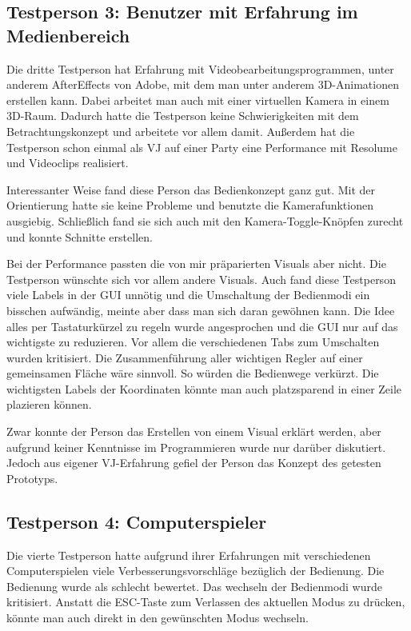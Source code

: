 \subsection{Testperson 3: Benutzer mit Erfahrung im Medienbereich}

Die dritte Testperson hat Erfahrung mit Videobearbeitungsprogrammen, unter anderem AfterEffects von Adobe, mit dem man
unter anderem 3D-Animationen erstellen kann. Dabei arbeitet man auch mit einer virtuellen Kamera in einem 3D-Raum.
Dadurch hatte die Testperson keine Schwierigkeiten mit dem Betrachtungskonzept und arbeitete vor allem damit.
Au\ss{}erdem hat die Testperson schon einmal als VJ auf einer Party eine Performance mit Resolume und Videoclips realisiert.

Interessanter Weise fand diese Person das Bedienkonzept ganz gut. Mit der Orientierung hatte sie keine Probleme und
benutzte die Kamerafunktionen ausgiebig. Schlie\ss{}lich fand sie sich auch mit den Kamera-Toggle-Kn\"opfen zurecht und
konnte Schnitte erstellen.

Bei der Performance passten die von mir pr\"aparierten Visuals aber nicht. Die Testperson w\"unschte sich vor allem andere
Visuals. Auch fand diese Testperson viele Labels in der GUI unn\"otig und die Umschaltung der Bedienmodi ein bisschen
aufw\"andig, meinte aber dass man sich daran gew\"ohnen kann. Die Idee alles per Tastaturk\"urzel zu regeln wurde
angesprochen und die GUI nur auf das wichtigste zu reduzieren. Vor allem die verschiedenen Tabs zum Umschalten wurden
kritisiert. Die Zusammenf\"uhrung aller wichtigen Regler auf einer gemeinsamen Fl\"ache w\"are sinnvoll. So w\"urden
die Bedienwege verk\"urzt. Die wichtigsten Labels der Koordinaten k\"onnte man auch platzsparend in einer Zeile plazieren
k\"onnen.

Zwar konnte der Person das Erstellen von einem Visual erkl\"art werden, aber aufgrund keiner Kenntnisse im Programmieren
wurde nur dar\"uber diskutiert. Jedoch aus eigener VJ-Erfahrung gefiel der Person das Konzept des getesten Prototyps.

\subsection{Testperson 4: Computerspieler}

Die vierte Testperson hatte aufgrund ihrer Erfahrungen mit verschiedenen Computerspielen viele Verbesserungsvorschl\"age
bez\"uglich der Bedienung. Die Bedienung wurde als schlecht bewertet. Das wechseln der Bedienmodi wurde kritisiert. Anstatt
die ESC-Taste zum Verlassen des aktuellen Modus zu dr\"ucken, k\"onnte man auch direkt in den gew\"unschten Modus wechseln.

